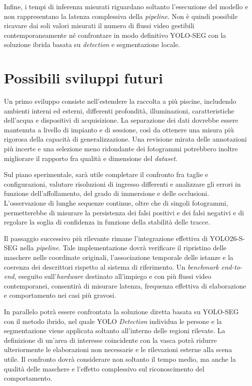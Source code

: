 Infine, i tempi di inferenza misurati riguardano soltanto l'esecuzione del modello e non rappresentano la latenza complessiva della \textit{pipeline}. Non è quindi possibile ricavare dai soli valori misurati il numero di flussi video gestibili contemporaneamente né confrontare in modo definitivo YOLO-SEG con la soluzione ibrida basata su \textit{detection} e segmentazione locale.

\section{Possibili sviluppi futuri}

Un primo sviluppo consiste nell'estendere la raccolta a più piscine, includendo ambienti interni ed esterni, differenti profondità, illuminazioni, caratteristiche dell'acqua e dispositivi di acquisizione. La separazione dei dati dovrebbe essere mantenuta a livello di impianto e di sessione, così da ottenere una misura più rigorosa della capacità di generalizzazione. Una revisione mirata delle annotazioni più incerte e una selezione meno ridondante dei fotogrammi potrebbero inoltre migliorare il rapporto fra qualità e dimensione del \textit{dataset}.

Sul piano sperimentale, sarà utile completare il confronto fra taglie e configurazioni, valutare risoluzioni di ingresso differenti e analizzare gli errori in funzione dell'affollamento, del grado di immersione e delle occlusioni. L'osservazione di lunghe sequenze continue, oltre che di singoli fotogrammi, permetterebbe di misurare la persistenza dei falsi positivi e dei falsi negativi e di regolare la soglia di confidenza in funzione della stabilità delle tracce.

Il passaggio successivo più rilevante rimane l'integrazione effettiva di YOLO26-S-SEG nella \textit{pipeline}. Tale implementazione dovrà verificare il ripristino delle maschere nelle coordinate originali, l'associazione temporale delle istanze e la coerenza dei descrittori rispetto al sistema di riferimento. Un \textit{benchmark end-to-end}, eseguito sull'\textit{hardware} destinato all'impiego e con più flussi video contemporanei, consentirà di misurare latenza, frequenza effettiva di elaborazione e comportamento nei casi più gravosi.

In parallelo potrà essere confrontata la soluzione diretta basata su YOLO-SEG con il metodo ibrido, nel quale YOLO \textit{Detection} individua le persone e la segmentazione viene applicata soltanto all'interno delle regioni rilevate. La definizione di un'area di interesse coincidente con la vasca potrà ridurre ulteriormente le elaborazioni non necessarie e le rilevazioni esterne alla scena utile. Il confronto dovrà considerare non soltanto il tempo medio, ma anche la qualità delle maschere e l'effetto complessivo sul riconoscimento del comportamento.

